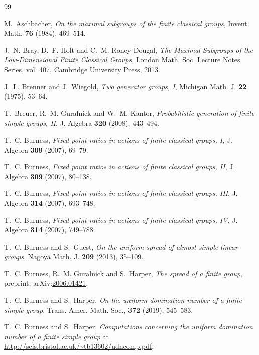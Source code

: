 \documentclass[11pt]{article}
\numberwithin{equation}{section}
\renewenvironment{thebibliography}[1]
{ \begin{oldthebibliography}{#1}
  \setlength{\parskip}{0pt}
  \setlength{\itemsep}{2pt plus 0.3ex}
  \bgroup\footnotesize }
{ \egroup \end{oldthebibliography} }
\theoremstyle{shdefinition}
\theoremstyle{shplain}
\newcommand{\<}{\langle}
\renewcommand{\>}{\rangle}
\renewcommand{\:}{\colon}
\begin{document}
\begin{thebibliography}{99}

M.~Aschbacher, \emph{On the maximal subgroups of the finite classical groups},
  Invent. Math. \textbf{76} (1984), 469--514.

J.~N. Bray, D.~F. Holt and C.~M. Roney-Dougal, \emph{The Maximal Subgroups of
  the Low-Dimensional Finite Classical Groups}, London Math. Soc. Lecture Notes
  Series, vol. 407, Cambridge University Press, 2013.

J.~L. Brenner and J.~Wiegold, \emph{Two generator groups, {I}}, Michigan Math.
  J. \textbf{22} (1975), 53--64.

T.~Breuer, R.~M. Guralnick and W.~M. Kantor, \emph{Probabilistic generation of
  finite simple groups, {II}}, J. Algebra \textbf{320} (2008), 443--494.

T.~C. Burness, \emph{Fixed point ratios in actions of finite classical groups,
  {I}}, J. Algebra \textbf{309} (2007), 69--79.

T.~C. Burness, \emph{Fixed point ratios in actions of finite classical groups,
  {II}}, J. Algebra \textbf{309} (2007), 80--138.

T.~C. Burness, \emph{Fixed point ratios in actions of finite classical groups,
  {III}}, J. Algebra \textbf{314} (2007), 693--748.

T.~C. Burness, \emph{Fixed point ratios in actions of finite classical groups,
  {IV}}, J. Algebra \textbf{314} (2007), 749--788.

T.~C. Burness and S.~Guest, \emph{On the uniform spread of almost simple linear
  groups}, Nagoya Math. J. \textbf{209} (2013), 35--109.

T.~C. Burness, R.~M. Guralnick and S.~Harper, \emph{The spread of a finite
  group}, {preprint}, arXiv:\url{2006.01421}.

T.~C. Burness and S.~Harper, \emph{On the uniform domination number of a finite
  simple group}, Trans. Amer. Math. Soc., \textbf{372} (2019), 545--583.
  
T.~C. Burness and S.~Harper, \emph{Computations concerning the uniform
  domination number of a finite simple group} {a}t
  \url{http://seis.bristol.ac.uk/~tb13602/udncomp.pdf}.


\end{thebibliography}
\end{document}

